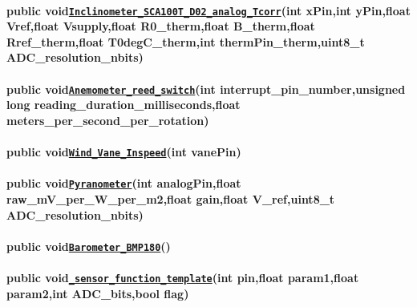 \paragraph*{{\ttfamily public void}\href{#classLogger_1a80fdea5a339573980f9544ac64678411}{\tt {\ttfamily Inclinometer\+\_\+\+S\+C\+A100\+T\+\_\+\+D02\+\_\+analog\+\_\+\+Tcorr}}{\ttfamily (int x\+Pin,int y\+Pin,float Vref,float Vsupply,float R0\+\_\+therm,float B\+\_\+therm,float Rref\+\_\+therm,float T0deg\+C\+\_\+therm,int therm\+Pin\+\_\+therm,uint8\+\_\+t A\+D\+C\+\_\+resolution\+\_\+nbits)}}

\paragraph*{{\ttfamily public void}\href{#classLogger_1a6c6a43a1b86f88c2a5e33d14c992e510}{\tt {\ttfamily Anemometer\+\_\+reed\+\_\+switch}}{\ttfamily (int interrupt\+\_\+pin\+\_\+number,unsigned long reading\+\_\+duration\+\_\+milliseconds,float meters\+\_\+per\+\_\+second\+\_\+per\+\_\+rotation)}}

\paragraph*{{\ttfamily public void}\href{#classLogger_1a31c3cba5ff5722fb66bf540bfbe8b25d}{\tt {\ttfamily Wind\+\_\+\+Vane\+\_\+\+Inspeed}}{\ttfamily (int vane\+Pin)}}

\paragraph*{{\ttfamily public void}\href{#classLogger_1ae4190ce7ccfd7b148a6151102a3bf93d}{\tt {\ttfamily Pyranometer}}{\ttfamily (int analog\+Pin,float raw\+\_\+m\+V\+\_\+per\+\_\+\+W\+\_\+per\+\_\+m2,float gain,float V\+\_\+ref,uint8\+\_\+t A\+D\+C\+\_\+resolution\+\_\+nbits)}}

\paragraph*{{\ttfamily public void}\href{#classLogger_1a40588117a274f0c6de926ef6ce1f0ba8}{\tt {\ttfamily Barometer\+\_\+\+B\+M\+P180}}{\ttfamily ()}}

\paragraph*{{\ttfamily public void}\href{#classLogger_1a98f3cc370c87d1e1eaf3eb6a7e0f1623}{\tt {\ttfamily \+\_\+sensor\+\_\+function\+\_\+template}}{\ttfamily (int pin,float param1,float param2,int A\+D\+C\+\_\+bits,bool flag)}}

